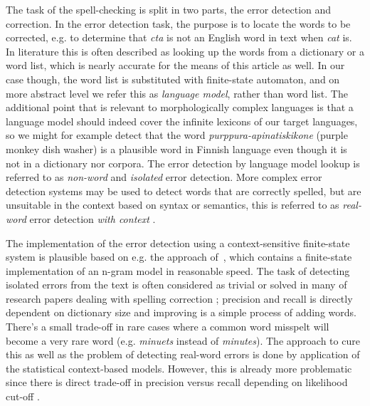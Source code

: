 \documentclass[a4paper,12pt]{article}
\begin{document}
The task of the spell-checking is split in two parts, the error detection and
correction. In the error detection task, the purpose is to locate the words to
be corrected, e.g. to determine that \emph{cta} is not an English word in text
when \emph{cat} is. In literature this is often described as looking up the
words from a dictionary or a word list, which is nearly accurate for the means
of this article as well. In our case though, the word list is substituted with
finite-state automaton, and on more abstract level we refer this as
\emph{language model}, rather than word list. The additional point that is
relevant to morphologically complex languages is that a language model should
indeed cover the infinite lexicons of our target languages, so we might for
example detect that the word \emph{purppura-apinatiskikone} (purple monkey dish
washer) is a plausible word in Finnish language even though it is not in a
dictionary nor corpora.  The error detection by language model lookup is
referred to as \emph{non-word} and \emph{isolated} error detection. More
complex error detection systems may be used to detect words that are correctly
spelled, but are unsuitable in the context based on syntax or semantics, this
is referred to as \emph{real-word} error detection \emph{with context}
\cite{mays/1991}.

The implementation of the error detection using a context-sensitive
finite-state system is plausible based on e.g. the approach
of~\cite{silfverberg/2010}, which contains a finite-state implementation of an
n-gram model in reasonable speed. The task of detecting isolated errors from
the text is often considered as trivial or solved in many of research papers
dealing with spelling correction \cite[e.g.][]{otero/2007}; precision and
recall is directly dependent on dictionary size and improving is a simple
process of adding words.  There's a small trade-off in rare cases where a
common word misspelt will become a very rare word (e.g. \emph{minuets} instead
of \emph{minutes}\cite{kukich1992techniques}). The approach to cure this as
well as the problem of detecting real-word errors is done by application of the
statistical context-based models.  However, this is already more problematic
since there is direct trade-off in precision versus recall depending on
likelihood cut-off \cite[]{hirst2008evaluation,wilcoxohearn2008realword}.
\end{document}
